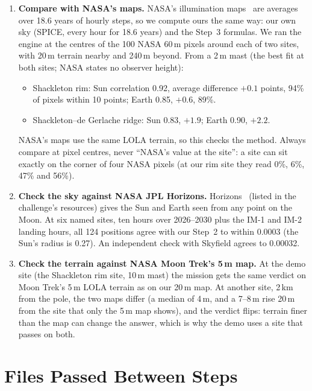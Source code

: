 \documentclass[11pt,a4paper]{article}
\begin{document}
\begin{enumerate}
\begin{itemize}
    \item 20\,m terrain out to 40\,km. At 20\,km, sectors are 0.044\textdegree{} off.
  \end{itemize}
  \item \textbf{Compare with NASA's maps.} NASA's illumination maps~\cite{pgda} are averages over 18.6 years of hourly steps, so we compute ours the same way: our own sky (SPICE, every hour for 18.6 years) and the Step~3 formulas. We ran the engine at the centres of the 100 NASA 60\,m pixels around each of two sites, with 20\,m terrain nearby and 240\,m beyond. From a 2\,m mast (the best fit at both sites; NASA states no observer height):
  \begin{itemize}
    \item Shackleton rim: Sun correlation 0.92, average difference $+0.1$ points, 94\% of pixels within 10 points; Earth 0.85, $+0.6$, 89\%.
    \item Shackleton--de Gerlache ridge: Sun 0.83, $+1.9$; Earth 0.90, $+2.2$.
  \end{itemize}
  NASA's maps use the same LOLA terrain, so this checks the method. Always compare at pixel centres, never ``NASA's value at the site'': a site can sit exactly on the corner of four NASA pixels (at our rim site they read 0\%, 6\%, 47\% and 56\%).
  \item \textbf{Check the sky against NASA JPL Horizons.} Horizons~\cite{horizons} (listed in the challenge's resources) gives the Sun and Earth seen from any point on the Moon. At six named sites, ten hours over 2026--2030 plus the IM-1 and IM-2 landing hours, all 124 positions agree with our Step~2 to within 0.0003\textdegree{} (the Sun's radius is 0.27\textdegree). An independent check with Skyfield agrees to 0.00032\textdegree.
  \item \textbf{Check the terrain against NASA Moon Trek's 5\,m map.} At the demo site (the Shackleton rim site, 10\,m mast) the mission gets the same verdict on Moon Trek's 5\,m LOLA terrain as on our 20\,m map. At another site, 2\,km from the pole, the two maps differ (a median of 4\,m, and a 7--8\,m rise 20\,m from the site that only the 5\,m map shows), and the verdict flips: terrain finer than the map can change the answer, which is why the demo uses a site that passes on both.
\end{enumerate}

\section{Files Passed Between Steps}
\end{document}
